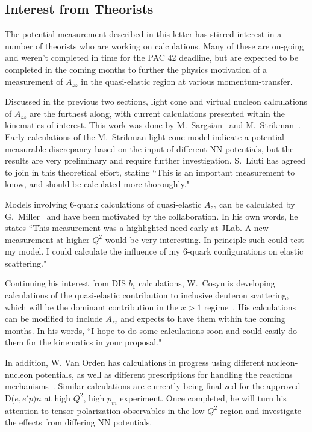 \subsection{Interest from Theorists}

The potential measurement described in this letter has stirred interest in a number of theorists who are working on calculations. Many of these are on-going and weren't completed in time for the PAC 42 deadline, but are expected to be completed in the coming months to further the physics motivation of a measurement of $A_{zz}$ in the quasi-elastic region at various momentum-transfer.

Discussed in the previous two sections, light cone and virtual nucleon calculations of $A_{zz}$ are the furthest along, with current calculations presented within the kinematics of interest. This work was done by M.~Sargsian~\cite{misak-convo} and M.~Strikman~\cite{strikman-convo}. Early calculations of the M.~Strikman light-cone model indicate a potential measurable discrepancy based on the input of different NN potentials, but the results are very preliminary and require further investigation. S.~Liuti has agreed to join in this theoretical effort, stating ``This is an important measurement to know, and should be calculated more thoroughly."~\cite{liuti-convo}

Models involving 6-quark calculations of quasi-elastic $A_{zz}$ can be calculated by G.~Miller~\cite{miller-convo} and have been motivated by the collaboration. In his own words, he states ``This measurement was a highlighted need early at JLab. A new measurement at higher $Q^2$ would be very interesting. In principle such could test my model. I could calculate the influence of my 6-quark configurations on elastic scattering."

Continuing his interest from DIS $b_1$ calculations, W.~Cosyn is developing calculations of the quasi-elastic contribution to inclusive deuteron scattering, which will be the dominant contribution in the $x>1$ regime~\cite{cosyn-convo}. His calculations can be modified to include $A_{zz}$ and expects to have them within the coming months. In his words, ``I hope to do some 
calculations soon and could easily do them for the kinematics in your 
proposal."


In addition, W. Van Orden has calculations in progress using different nucleon-nucleon potentials, as well as different prescriptions for handling the reactions mechanisms~\cite{vanorden-convo}.  Similar calculations are currently being finalized for the approved
D($e,e'p)n$ at high $Q^2$, high $p_m$ experiment. Once completed, he will turn his attention to tensor polarization observables in the low $Q^2$ region and investigate the effects from differing NN potentials.